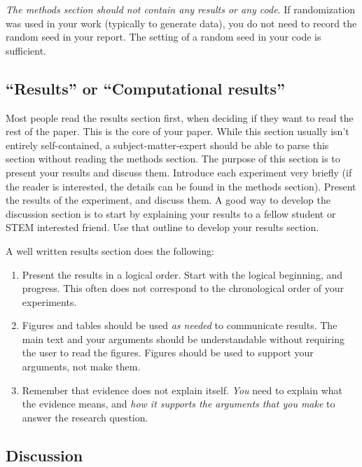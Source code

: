 \documentclass[]{article}
\begin{document}
\emph{The methods section should not contain any results or any code}. If randomization was used in your work (typically to generate data), you do not need to record the random seed in your report. The setting of a random seed in your code is sufficient.

\subsection{``Results'' or ``Computational results''}
Most people read the results section first, when deciding if they want to read the rest of the paper. This is the core of your paper.
While this section usually isn't entirely self-contained, a subject-matter-expert should be able to parse this section without reading the methods section. The purpose of this section is to present your results and discuss them. Introduce each experiment very briefly (if the reader is interested, the details can be found in the methods section). Present the results of the experiment, and discuss them. A good way to develop the discussion section is to start by explaining your results to a fellow student or STEM interested friend. Use that outline to develop your results section.

A well written results section does the following:
\begin{enumerate}
    \item Present the results in a logical order. Start with the logical beginning, and progress. This often does not correspond to the chronological order of your experiments.
    \item Figures and tables should be used \emph{as needed} to communicate results. The main text and your arguments should be understandable without requiring the user to read the figures. Figures should be used to support your arguments, not make them.
    \item Remember that evidence does not explain itself. \emph{You} need to explain what the evidence means, and \emph{how it supports the arguments that you make} to answer the research question.
\end{enumerate}

\subsection{Discussion}
\end{document}

